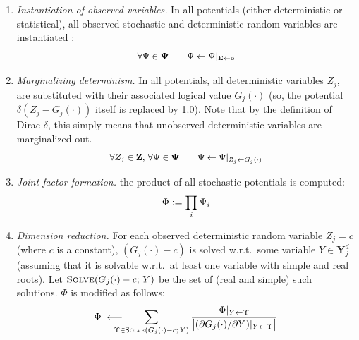 \documentclass{article}
\newcommand{\bvec}[1]{\textbf{#1}}
\begin{document}

\begin{enumerate}
\item \emph{Instantiation of observed variables.} 
In all potentials (either deterministic or statistical), all observed stochastic and deterministic random variables are instantiated
:
\begin{equation*}\footnotesize \vspace{-0.5mm}
\forall \Psi \in \boldsymbol{\Psi} \qquad \Psi \leftarrow \Psi|_{\bvec{E} \leftarrow \bvec{e}}
\end{equation*} 
\item 
\emph{Marginalizing determinism.} 
In all potentials, all deterministic variables $Z_j$, are 
substituted with their associated logical value $G_j(\cdot)$ (so, the potential $\delta ( Z_j - G_j(\cdot) )$ itself is replaced by 1.0). Note that by the definition of Dirac $\delta$, this simply means that  unobserved deterministic variables are marginalized out.
\begin{equation*}\footnotesize \vspace{-0.5mm}
\forall Z_j \in \bvec{Z},\,
\forall \Psi \in \boldsymbol{\Psi} 
\qquad
\Psi \leftarrow \Psi|_{Z_j \leftarrow G_j (\cdot)}
\end{equation*}
\item \emph{Joint factor formation.} the product of all stochastic potentials is computed: 
\begin{equation*}\footnotesize \vspace{-0.5mm}
\Phi := \prod_{i} \Psi_i
\end{equation*}
%
\item \emph{Dimension reduction.} %
For each observed deterministic random variable $Z_j = c$ (where $c$ is a constant),
$(G_j(\cdot) - c)$ is solved w.r.t.\ some variable 
$Y  \in \bvec{Y}_j^d$ (assuming that it is solvable %
w.r.t.\ at least one variable with simple and real roots).
Let  
$\textsc{Solve}(G_j(\cdot) - c; \, Y)$
be the set of (real and simple) such solutions.
$\Phi$ is modified as follows:
\begin{equation}
\label{e:core}
\Phi 
\;
\longleftarrow
\!\!\!\!\!\!\!
\sum_{\Upsilon \in \textsc{Solve}(G_j(\cdot) - c;\, Y)}
\frac{\Phi|_{Y \leftarrow \Upsilon}}{
\big|(\partial G_j(\cdot) / \partial Y) |_{Y \leftarrow \Upsilon}
\big|
}
\end{equation}
\end{enumerate}
\end{document}
